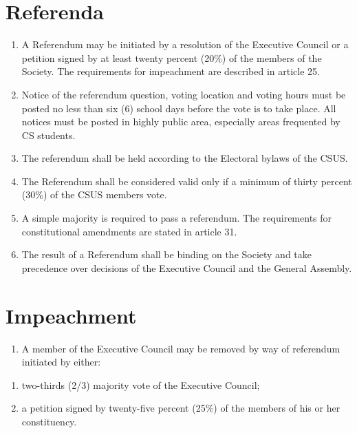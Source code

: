 \section{Referenda}\label{referenda}

\begin{enumerate}
\def\labelenumi{\arabic{enumi}.}
\item
  A Referendum may be initiated by a resolution of the Executive Council
  or a petition signed by at least twenty percent (20\%) of the members
  of the Society. The requirements for impeachment are described in
  article 25.
\item
  Notice of the referendum question, voting location and voting hours
  must be posted no less than six (6) school days before the vote is to
  take place. All notices must be posted in highly public area,
  especially areas frequented by CS students.
\item
  The referendum shall be held according to the Electoral bylaws of the
  CSUS.
\item
  The Referendum shall be considered valid only if a minimum of thirty
  percent (30\%) of the CSUS members vote.
\item
  A simple majority is required to pass a referendum. The requirements
  for constitutional amendments are stated in article 31.
\item
  The result of a Referendum shall be binding on the Society and take
  precedence over decisions of the Executive Council and the General
  Assembly.
\end{enumerate}

\section{Impeachment}\label{impeachment}

\begin{enumerate}
\def\labelenumi{\arabic{enumi}.}
\tightlist
\item
  A member of the Executive Council may be removed by way of referendum
  initiated by either:
\end{enumerate}

\begin{enumerate}
\def\labelenumi{(\alph{enumi})}
\tightlist
\item
  two-thirds (2/3) majority vote of the Executive Council;
\item
  a petition signed by twenty-five percent (25\%) of the members of his
  or her constituency.
\end{enumerate}

